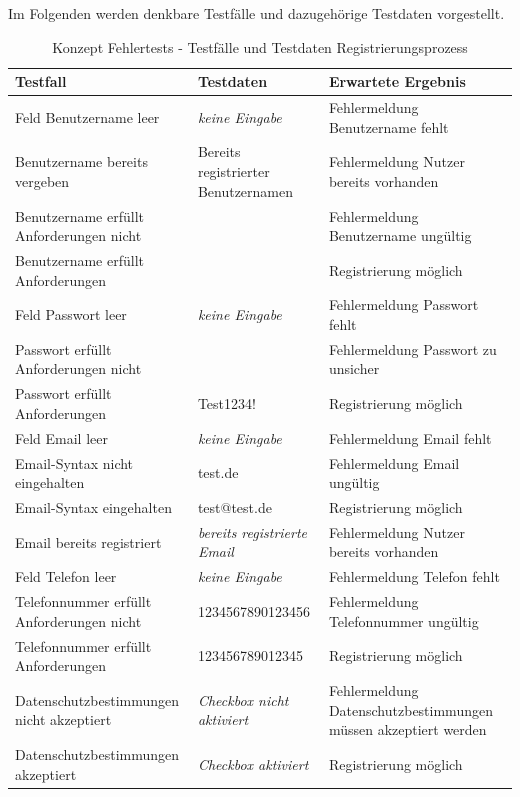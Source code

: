 Im Folgenden werden denkbare Testfälle und dazugehörige Testdaten vorgestellt.

\begin{table}
\centering
\begin{tabular}{p{4.5cm}|p{4.5cm}|p{4.5cm}}
Testfall									& Testdaten												& Erwartete Ergebnis\\
\hline
Feld Benutzername leer						& \emph{keine Eingabe}									& Fehlermeldung Benutzername fehlt\\
Benutzername bereits vergeben				& Bereits registrierter Benutzernamen 					& Fehlermeldung Nutzer bereits vorhanden\\
Benutzername erfüllt Anforderungen nicht	& 														& Fehlermeldung Benutzername ungültig\\
Benutzername erfüllt Anforderungen			&														& Registrierung möglich\\
Feld Passwort leer							& \emph{keine Eingabe}									& Fehlermeldung Passwort fehlt\\
Passwort erfüllt Anforderungen nicht		& 														& Fehlermeldung Passwort zu unsicher\\
Passwort erfüllt Anforderungen				& Test1234!												& Registrierung möglich\\
Feld Email leer								& \emph{keine Eingabe}									& Fehlermeldung Email fehlt\\
Email-Syntax nicht eingehalten				& test.de 												& Fehlermeldung Email ungültig\\
Email-Syntax eingehalten					& test@test.de 											& Registrierung möglich\\
Email bereits registriert 					& \emph{bereits registrierte Email}						& Fehlermeldung Nutzer bereits vorhanden\\
Feld Telefon leer 							& \emph{keine Eingabe}									& Fehlermeldung Telefon fehlt\\
Telefonnummer erfüllt Anforderungen nicht	& 1234567890123456										& Fehlermeldung Telefonnummer ungültig\\
Telefonnummer erfüllt Anforderungen			& 123456789012345										& Registrierung möglich\\
Datenschutzbestimmungen nicht akzeptiert	& \emph{Checkbox nicht aktiviert}						& Fehlermeldung Datenschutzbestimmungen müssen akzeptiert werden\\
Datenschutzbestimmungen akzeptiert			& \emph{Checkbox aktiviert}								& Registrierung möglich\\

\end{tabular}
\label{tab:testing:fehlertest:registrierung}
\caption{Konzept Fehlertests - Testfälle und Testdaten Registrierungsprozess}
\end{table}

